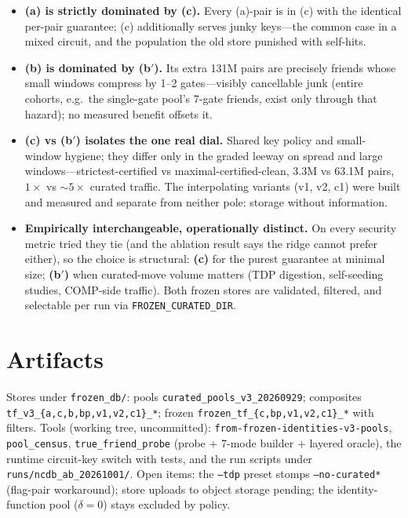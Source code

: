 \documentclass[11pt]{article}
\newcommand{\code}[1]{\texttt{#1}}
\begin{document}
\begin{itemize}
\item \textbf{(a) is strictly dominated by (c).} Every (a)-pair is in (c)
with the identical per-pair guarantee; (c) additionally serves junky
keys---the common case in a mixed circuit, and the population the old store
punished with self-hits.
\item \textbf{(b) is dominated by (b$'$).} Its extra 131M pairs are
precisely friends whose small windows compress by 1--2 gates---visibly
cancellable junk (entire cohorts, e.g.\ the single-gate pool's 7-gate
friends, exist only through that hazard); no measured benefit offsets it.
\item \textbf{(c) vs (b$'$) isolates the one real dial.} Shared key policy
and small-window hygiene; they differ only in the graded leeway on spread
and large windows---strictest-certified vs maximal-certified-clean, 3.3M vs
63.1M pairs, $1\times$ vs ${\sim}5\times$ curated traffic. The interpolating
variants (v1, v2, c1) were built and measured and separate from neither
pole: storage without information.
\item \textbf{Empirically interchangeable, operationally distinct.} On
every security metric tried they tie (and the ablation result says the
ridge cannot prefer either), so the choice is structural: \textbf{(c)} for
the purest guarantee at minimal size; \textbf{(b$'$)} when curated-move
volume matters (TDP digestion, self-seeding studies, COMP-side traffic).
Both frozen stores are validated, filtered, and selectable per run via
\code{FROZEN\_CURATED\_DIR}.
\end{itemize}

\section{Artifacts}

Stores under \code{frozen\_db/}: pools \code{curated\_pools\_v3\_20260929};
composites \code{tf\_v3\_\{a,c,b,bp,v1,v2,c1\}\_*}; frozen
\code{frozen\_tf\_\{c,bp,v1,v2,c1\}\_*} with filters. Tools (working tree,
uncommitted): \code{from-frozen-identities-v3-pools}, \code{pool\_census},
\code{true\_friend\_probe} (probe + 7-mode builder + layered oracle), the
runtime circuit-key switch with tests, and the run scripts under
\code{runs/ncdb\_ab\_20261001/}. Open items: the \code{--tdp} preset stomps
\code{--no-curated*} (flag-pair workaround); store uploads to object storage
pending; the identity-function pool ($\delta=0$) stays excluded by policy.
\end{document}

